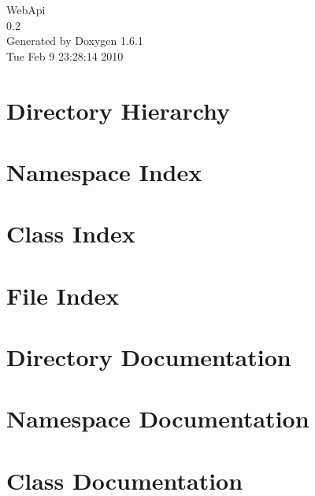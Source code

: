 \documentclass[a4paper]{book}
\begin{document}
\hypersetup{pageanchor=false}
\begin{titlepage}
\vspace*{7cm}
\begin{center}
{\Large WebApi \\[1ex]\large 0.2 }\\
\vspace*{1cm}
{\large Generated by Doxygen 1.6.1}\\
\vspace*{0.5cm}
{\small Tue Feb 9 23:28:14 2010}\\
\end{center}
\end{titlepage}
\clearemptydoublepage
{}
\tableofcontents
\clearemptydoublepage
{}
\hypersetup{pageanchor=true}
\chapter{Directory Hierarchy}

\chapter{Namespace Index}

\chapter{Class Index}

\chapter{File Index}

\chapter{Directory Documentation}




\chapter{Namespace Documentation}

\chapter{Class Documentation}











\end{document}
